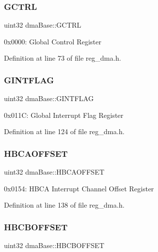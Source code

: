 \subsubsection{\texorpdfstring{G\+C\+T\+RL}{GCTRL}}
{\footnotesize\ttfamily uint32 dma\+Base\+::\+G\+C\+T\+RL}

0x0000\+: Global Control Register 

Definition at line 73 of file reg\+\_\+dma.\+h.

\mbox{\label{structdmaBase_ab5acbfff366acf17abcd6e4efe06cd56}} 
\subsubsection{\texorpdfstring{G\+I\+N\+T\+F\+L\+AG}{GINTFLAG}}
{\footnotesize\ttfamily uint32 dma\+Base\+::\+G\+I\+N\+T\+F\+L\+AG}

0x011C\+: Global Interrupt Flag Register 

Definition at line 124 of file reg\+\_\+dma.\+h.

\mbox{\label{structdmaBase_aa0ae5c75485d45c134578e608b139eda}} 
\subsubsection{\texorpdfstring{H\+B\+C\+A\+O\+F\+F\+S\+ET}{HBCAOFFSET}}
{\footnotesize\ttfamily uint32 dma\+Base\+::\+H\+B\+C\+A\+O\+F\+F\+S\+ET}

0x0154\+: H\+B\+CA Interrupt Channel Offset Register 

Definition at line 138 of file reg\+\_\+dma.\+h.

\mbox{\label{structdmaBase_a6ba4e8838d28cc2d83277bc0ce892ff9}} 
\subsubsection{\texorpdfstring{H\+B\+C\+B\+O\+F\+F\+S\+ET}{HBCBOFFSET}}
{\footnotesize\ttfamily uint32 dma\+Base\+::\+H\+B\+C\+B\+O\+F\+F\+S\+ET}

